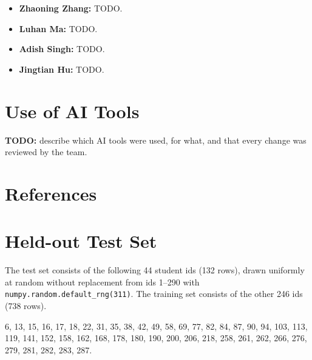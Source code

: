 \documentclass[11pt,letterpaper]{article}
\begin{document}
\begin{itemize}
\item \textbf{Zhaoning Zhang:} TODO.
\item \textbf{Luhan Ma:} TODO.
\item \textbf{Adish Singh:} TODO.
\item \textbf{Jingtian Hu:} TODO.
\end{itemize}

\section*{Use of AI Tools}

\textbf{TODO:} describe which AI tools were used, for what, and that every change
was reviewed by the team.

\section{References}\label{sec:references}

\renewcommand{\refname}{\vspace{-2.5em}} %



\appendix
\section{Held-out Test Set}\label{app:test-ids}
The test set consists of the following 44 student ids (132 rows), drawn uniformly
at random without replacement from ids 1--290 with
\texttt{numpy.random.default\_rng(311)}. The training set consists of the other
246 ids (738 rows).

\medskip
\noindent\small
6, 13, 15, 16, 17, 18, 22, 31, 35, 38, 42, 49, 58, 69, 77, 82, 84, 87, 90, 94, 103,
113, 119, 141, 152, 158, 162, 168, 178, 180, 190, 200, 206, 218, 258, 261, 262, 266,
276, 279, 281, 282, 283, 287.
\normalsize
\end{document}
